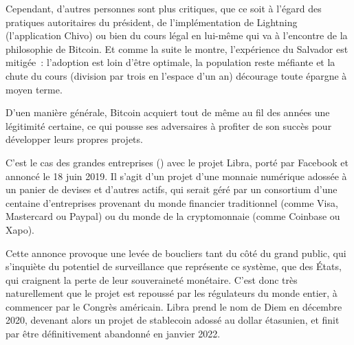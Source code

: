 Cependant, d'autres personnes sont plus critiques, que ce soit à l'égard des pratiques autoritaires du président, de l'implémentation de Lightning (l'application Chivo) ou bien du cours légal en lui-même qui va à l'encontre de la philosophie de Bitcoin. Et comme la suite le montre, l'expérience du Salvador est mitigée~: l'adoption est loin d'être optimale, la population reste méfiante et la chute du cours (division par trois en l'espace d'un an) décourage toute épargne à moyen terme.

D'uen manière générale, Bitcoin acquiert tout de même au fil des années une légitimité certaine, ce qui pousse ses adversaires à profiter de son succès pour développer leurs propres projets.

C'est le cas des grandes entreprises () avec le projet Libra, porté par Facebook et annoncé le 18 juin 2019. Il s'agit d'un projet d'une monnaie numérique adossée à un panier de devises et d'autres actifs, qui serait géré par un consortium d'une centaine d'entreprises provenant du monde financier traditionnel (comme Visa, Mastercard ou Paypal) ou du monde de la cryptomonnaie (comme Coinbase ou Xapo).

Cette annonce provoque une levée de boucliers tant du côté du grand public, qui s'inquiète du potentiel de surveillance que représente ce système, que des États, qui craignent la perte de leur souveraineté monétaire. C'est donc très naturellement que le projet est repoussé par les régulateurs du monde entier, à commencer par le Congrès américain. Libra prend le nom de Diem en décembre 2020, devenant alors un projet de stablecoin adossé au dollar étasunien, et finit par être définitivement abandonné en janvier 2022.

